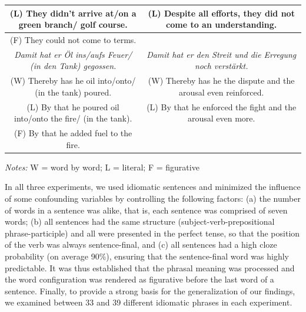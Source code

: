 \documentclass[output=paper]{langsci/langscibook}
\begin{document}
\begin{table}[]
{\begin{tabular}{|c|c|}
(L) They didn’t arrive at/on a green branch/ golf course.                             & (L) Despite all efforts, they did not come to an understanding.   \\ \hline
(F) They could not come to terms.                                                     &                                                                   \\ \hline
\textit{Damit hat er Öl ins/aufs Feuer/ (in den Tank) gegossen.}                      & \textit{Damit hat er den Streit und die Erregung noch verstärkt.} \\ \hline
(W) Thereby has he oil into/onto/ (in the tank) poured.                               & (W) Thereby has he the dispute and the arousal even reinforced.   \\ \hline
(L) By that he poured oil into/onto the fire/ (in the tank).                          & (L) By that he enforced the fight and the arousal even more.      \\ \hline
(F) By that he added fuel to the fire.                                                &                                                                   \\ \hline
\end{tabular}}
\footnotesize{\textit{Notes:} W = word by word; L = literal; F = figurative}
\end{table}

In all three experiments, we used idiomatic sentences and minimized the influence of some confounding variables by controlling the following factors: (a) the number of words in a sentence was alike, that is, each sentence was comprised of seven words; (b) all sentences had the same structure (subject-verb-prepositional phrase-participle) and all were presented in the perfect tense, so that the position of the verb was always sentence-final, and (c) all sentences had a high cloze probability (on average 90\%), ensuring that the sentence-final word was highly predictable. It was thus established that the phrasal meaning was processed and the word configuration was rendered as figurative before the last word of a sentence. Finally, to provide a strong basis for the generalization of our findings, we examined between 33 and 39 different idiomatic phrases in each experiment. 
\end{document}
